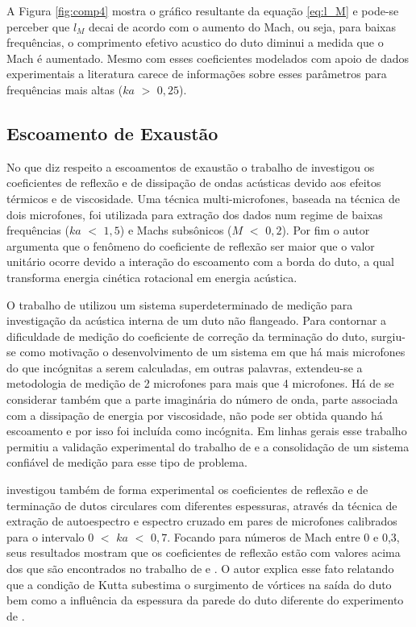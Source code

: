  A Figura \ref{fig:comp4} mostra o gráfico resultante da equação \ref{eq:l_M} e pode-se perceber que $l_{M}$ decai de acordo com o aumento do Mach, ou seja, para baixas frequências, o comprimento efetivo acustico do duto diminui a medida que o Mach é aumentado. Mesmo com esses coeficientes modelados com apoio de dados experimentais a literatura carece de informações sobre esses parâmetros para frequências mais altas ($ka$ $>$ $0,25$).


\subsection{Escoamento de Exaustão}

No que diz respeito a escoamentos de exaustão o trabalho de  investigou os coeficientes de reflexão e de dissipação de ondas acústicas devido aos efeitos térmicos e de viscosidade. Uma técnica multi-microfones, baseada na técnica de dois microfones, foi utilizada para extração dos dados num regime de baixas frequências ($ka$ $<$ $1,5$) e Machs subsônicos ($M$ $<$ $0,2$). Por fim o autor argumenta que o fenômeno do coeficiente de reflexão ser maior que o valor unitário ocorre devido a interação do escoamento com a borda do duto, a qual transforma energia cinética rotacional em energia acústica. 

O trabalho de  utilizou um sistema superdeterminado de medição para investigação da acústica interna de um duto não flangeado. Para contornar a dificuldade de medição do coeficiente de correção da terminação do duto, surgiu-se como motivação o desenvolvimento de um sistema em que há mais microfones do que incógnitas a serem calculadas, em outras palavras, extendeu-se a metodologia de medição de 2 microfones para mais que 4 microfones. Há de se considerar também que a parte imaginária do número de onda, parte associada com a dissipação de energia por viscosidade, não pode ser obtida quando há escoamento e por isso foi incluída como incógnita. Em linhas gerais esse trabalho permitiu a validação experimental do trabalho de  e a consolidação de um sistema confiável de medição para esse tipo de problema.

 investigou também de forma experimental os coeficientes de reflexão e de terminação de dutos circulares com diferentes espessuras, através da técnica de extração de autoespectro e espectro cruzado em pares de microfones calibrados para o intervalo $0$ $<$ $ka$ $<$ $0,7$. Focando para números de Mach entre 0 e 0,3, seus resultados mostram que os coeficientes de reflexão estão com valores acima dos que são encontrados no trabalho de  e . O autor explica esse fato relatando que a condição de Kutta subestima o surgimento de vórtices na saída do duto bem como a influência da espessura da parede do duto diferente do experimento de .


